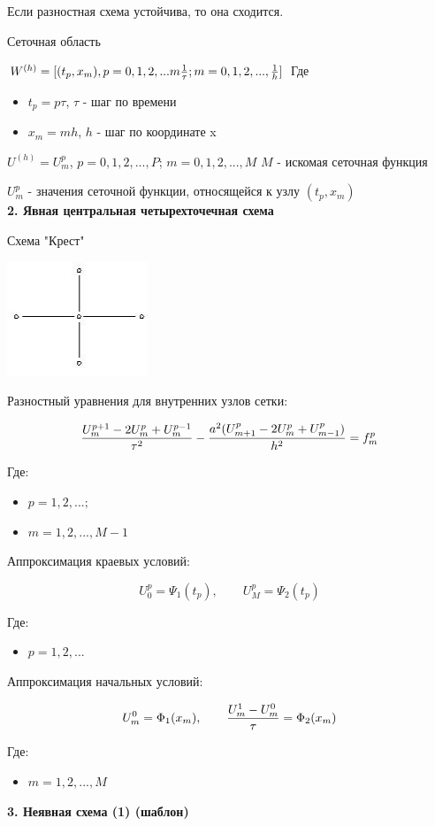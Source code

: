\documentclass[a4paper]{article}
\begin{document}
Если разностная схема устойчива, то она сходится.

Сеточная область

$W^{(h)} = [(t_p,x_m),p=0,1,2,...m{1\over\tau};m=0,1,2,...,{1\over h}]$
Где
\begin{itemize}
    \item $t_p=p\tau$, $\tau$ - шаг по времени
    \item $x_m=mh$, $h$ - шаг по координате x
\end{itemize}

$U^{(h)}=U_m^p$, $p=0,1,2,...,P$; $m=0,1,2,...,M$ $M$ - искомая сеточная функция

$U_m^p$ - значения сеточной функции, относящейся к узлу $(t_p,x_m)$ \\
\textbf{2. Явная центральная четырехточечная схема}

Схема "Крест"

\includegraphics{img/1.jpg}

Разностный уравнения для внутренних узлов сетки:

$${U_m^{p+1}-2U_m^p+U_m^{p-1} \over \tau^2} - {a^2(U_{m+1}^p-2U_m^p+U_{m-1}^p) \over h^2} = f_m^p$$

Где:
\begin{itemize}
    \item $p=1,2,...;$
    \item $m=1,2,...,M-1$
\end{itemize}

Аппроксимация краевых условий:

$$ U_0^p = \Psi_1(t_p), \qquad U_M^p=\Psi_2(t_p)$$

Где:
\begin{itemize}
    \item $p=1,2,...$
\end{itemize}

Аппроксимация начальных условий:

$$U_m^0=\Phi_1(x_m), \qquad {U_m^1-U_m^0 \over \tau} = \Phi_2(x_m)$$

Где:
\begin{itemize}
    \item $m=1,2,...,M$
\end{itemize} 
\textbf{3. Неявная схема (1) (шаблон)}
\end{document}
